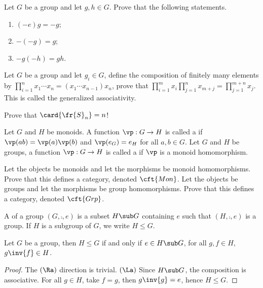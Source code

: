 \documentclass[10pt]{article}
\begin{document}
\begin{problem}
    Let $G$ be a group and let $g,h\in G$. Prove that the following statements.
    \begin{enumerate}
        \item $(-e)g=-g$;
        \item $-(-g)=g$;
        \item $-g(-h)=gh$.
    \end{enumerate}
\end{problem}
\begin{problem}
    Let $G$ be a group and let ${g}_{i}\in G$, define the composition of finitely many elements by ${\prod}_{i=1}^{n}{x}_{1}\cdots{x}_{n}=({x}_{1}\cdots{x}_{n-1}){x}_{n}$, prove that ${\prod}_{i=1}^{m}{x}_{i}{\prod}_{j=1}^{n}{x}_{m+j}={\prod}_{j=1}^{m+n}{x}_{j}$. This is called the generalized associativity.
\end{problem}
\begin{problem}
    Prove that $\card{{\fr{S}}_{n}}=n$!
\end{problem}
\begin{definition}
    Let $G$ and $H$ be monoids. A function $\vp:G\to H$ is called a  if $\vp(ab)=\vp(a)\vp(b)$ and $\vp({e}_{G})={e}_{H}$ for all $a,b\in G$. Let $G$ and $H$ be groups, a function $\vp:G\to H$ is called a  if $\vp$ is a monoid homomorphism.
\end{definition}
\begin{problem}
    Let the objects be monoids and let the morphisms be monoid homomorphisms. Prove that this defines a category, denoted $\cft{Mon}$. Let the objects be groups and let the morphisms be group homomorphisms. Prove that this defines a category, denoted $\cft{Grp}$.
\end{problem}
\begin{definition}
    A  of a group $(G,\comp,e)$ is a subset $H\sub G$ containing $e$ such that $(H,\comp,e)$ is a group. If $H$ is a subgroup of $G$, we write $H\le G$.
\end{definition}
\begin{proposition}
    Let $G$ be a group, then $H\le G$ if and only if $e\in H\sub G$, for all $g,f\in H$, $g\inv{f}\in H$. 
\end{proposition}
\begin{proof}
    The $(\Ra)$ direction is trivial. $(\La)$ Since $H\sub G$, the composition is associative. For all $g\in H$, take $f=g$, then $g\inv{g}=e$, hence $H\le G$.
\end{proof}
\end{document}

